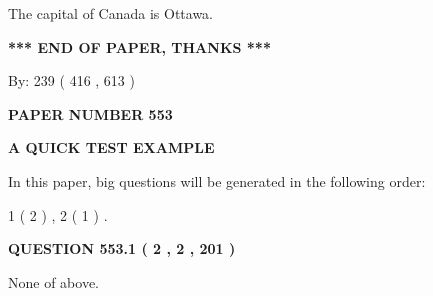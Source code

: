 \documentclass[12pt]{article}
\begin{document}
  
 
 
\noindent{}
 
 
The capital of Canada is Ottawa.
 
 
 
 
   
   
 \vspace{0.2in}
 
   
   
   
   
\vspace{1.0in} 
{\textbf{\large{ *** END OF PAPER, THANKS *** }}} 
   
   
\hspace{1.0in} By: 
 239 ( 416 ,  613 )
   
   
   
   
\newpage 
\setcounter{page}{ 
   553001 } 
   
   
   
   
 {\textbf{ \Large{ PAPER NUMBER  553  }}}
   
   
\vspace{0.2in}
   
   
   
   
   
   
 \vspace{0.2in}
{\LARGE {\textbf{ A QUICK TEST EXAMPLE}}}
   
   
   
\vspace{0.2in}
   
In this paper, big questions will be generated in the following order: 
   
   
   1 ( 2 )
 ,
   2 ( 1 )
 .
  
\vspace{0.2in}
  
{\textbf{\Large{QUESTION
553.1 
 ( 2 , 2 , 201 )
}}}
  
  
 
 
\noindent{}
 
 
 None of above.
 
 
 
 
  
\vspace{0.2in}
  
\end{document}
